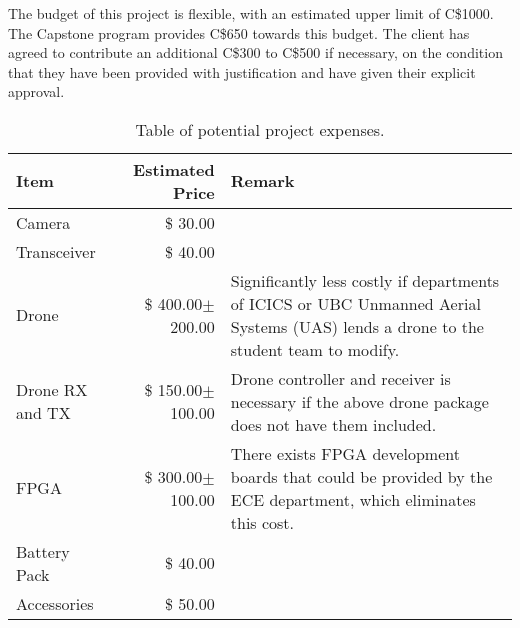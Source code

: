 The budget of this project is flexible, with an estimated upper limit of C\$1000. 
The Capstone program provides C\$650 towards this budget.
The client has agreed to contribute an additional C\$300 to C\$500 if necessary, on the condition that they have been provided with justification and have given their explicit approval.

\begin{table}[H]
    \centering
    \caption{Table of potential project expenses.}
    \label{table:budget-items}

    \begin{tabular}{lrp{9cm}}

    \hline
    \textbf{Item} & \textbf{Estimated Price} & \textbf{Remark}\\
    \hline
    Camera&\$ \hfill30.00&\\
    Transceiver&\$ \hfill40.00&\\
    Drone&\$ \hfill400.00$\pm$200.00& Significantly less costly if departments of ICICS or UBC Unmanned Aerial Systems (UAS) lends a drone to the student team to modify.\\
    Drone RX and TX & \$ \hfill 150.00$\pm$100.00 & Drone controller and receiver is necessary if the above drone package does not have them included.\\
    FPGA&\$ \hfill 300.00$\pm$100.00& There exists FPGA development boards that could be provided by the ECE department, which eliminates this cost.\\
    Battery Pack&\$ \hfill40.00&\\
    Accessories&\$ \hfill50.00&\\
    \hline

    \end{tabular} 
\end{table}
